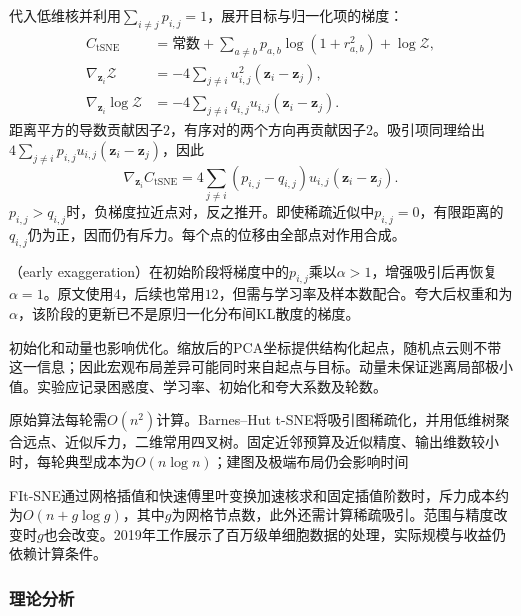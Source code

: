 代入低维核并利用$\sum_{i\ne j}p_{i,j}=1$，展开目标与归一化项的梯度：
\begin{equation}
  \label{eq:dim-tsne-gradient-derivation}
  \begin{aligned}
    C_{\mathrm{tSNE}}
      &=\text{常数}
        +\sum_{a\ne b}p_{a,b}\log(1+r_{a,b}^2)
        +\log\mathcal{Z},\\
    \nabla_{\bm{z}_i}\mathcal{Z}
      &=-4\sum_{j\ne i}u_{i,j}^2(\bm{z}_i-\bm{z}_j),\\
    \nabla_{\bm{z}_i}\log\mathcal{Z}
      &=-4\sum_{j\ne i}q_{i,j}u_{i,j}(\bm{z}_i-\bm{z}_j).
  \end{aligned}
\end{equation}
距离平方的导数贡献因子$2$，有序对的两个方向再贡献因子$2$。吸引项同理给出$4\sum_{j\ne i}p_{i,j}u_{i,j}(\bm{z}_i-\bm{z}_j)$，因此
\begin{equation}
  \label{eq:dim-tsne-gradient}
  \nabla_{\bm{z}_i}C_{\mathrm{tSNE}}
    =4\sum_{j\ne i}(p_{i,j}-q_{i,j})u_{i,j}
      (\bm{z}_i-\bm{z}_j).
\end{equation}
$p_{i,j}>q_{i,j}$时，负梯度拉近点对，反之推开。即使稀疏近似中$p_{i,j}=0$，有限距离的$q_{i,j}$仍为正，因而仍有斥力。每个点的位移由全部点对作用合成。

（early exaggeration）在初始阶段将梯度中的$p_{i,j}$乘以$\alpha>1$，增强吸引后再恢复$\alpha=1$。原文使用$4$，后续也常用$12$，但需与学习率及样本数配合。夸大后权重和为$\alpha$，该阶段的更新已不是原归一化分布间KL散度的梯度。

初始化和动量也影响优化。缩放后的PCA坐标提供结构化起点，随机点云则不带这一信息；因此宏观布局差异可能同时来自起点与目标。动量未保证逃离局部极小值。实验应记录困惑度、学习率、初始化和夸大系数及轮数。

原始算法每轮需$O(n^2)$计算。Barnes--Hut t-SNE将吸引图稀疏化，并用低维树聚合远点、近似斥力，二维常用四叉树。固定近邻预算及近似精度、输出维数较小时，每轮典型成本为$O(n\log n)$；建图及极端布局仍会影响时间

FIt-SNE通过网格插值和快速傅里叶变换加速核求和固定插值阶数时，斥力成本约为$O(n+g\log g)$，其中$g$为网格节点数，此外还需计算稀疏吸引。范围与精度改变时$g$也会改变。2019年工作展示了百万级单细胞数据的处理，实际规模与收益仍依赖计算条件。

\subsubsection{理论分析}
\label{sec:dim-tsne-theory}

